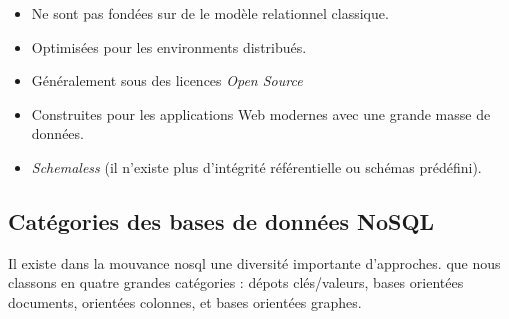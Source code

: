 \begin{itemize}
\item Ne sont pas fondées sur de le modèle relationnel classique.
\item Optimisées pour les environments distribués.
\item Généralement sous des licences \emph{Open Source}
\item Construites pour les applications Web modernes avec une grande
  masse de données.
\item \emph{Schemaless} (il n'existe plus d'intégrité référentielle ou
  schémas prédéfini).
\end{itemize}

  \subsection{Catégories des bases de données NoSQL}
  \label{nosql}
  Il existe dans la mouvance \acrshort{nosql} une diversité importante
  d'approches. que nous classons en quatre grandes catégories : dépots
  clés/valeurs, bases orientées documents, orientées colonnes, et
  bases orientées graphes.

